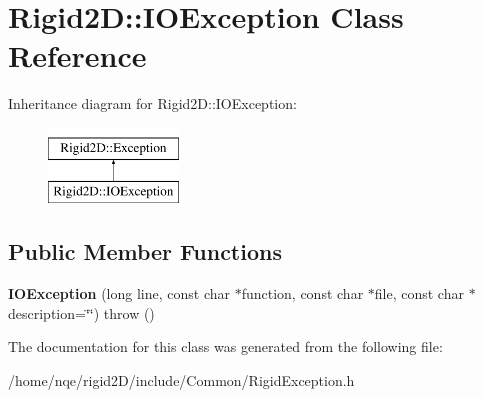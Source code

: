 \hypertarget{class_rigid2_d_1_1_i_o_exception}{
\section{Rigid2D::IOException Class Reference}
\label{class_rigid2_d_1_1_i_o_exception}
}
Inheritance diagram for Rigid2D::IOException:\begin{figure}[H]
\begin{center}
\leavevmode
\includegraphics[height=2cm]{class_rigid2_d_1_1_i_o_exception}
\end{center}
\end{figure}
\subsection*{Public Member Functions}
\begin{DoxyCompactItemize}
\item 
\hypertarget{class_rigid2_d_1_1_i_o_exception_aea931505e9693dc808fa49a82a0c09b5}{
{\bfseries IOException} (long line, const char $\ast$function, const char $\ast$file, const char $\ast$description=\char`\"{}\char`\"{})  throw ()}
\label{class_rigid2_d_1_1_i_o_exception_aea931505e9693dc808fa49a82a0c09b5}

\end{DoxyCompactItemize}


The documentation for this class was generated from the following file:\begin{DoxyCompactItemize}
\item 
/home/nqe/rigid2D/include/Common/RigidException.h\end{DoxyCompactItemize}
